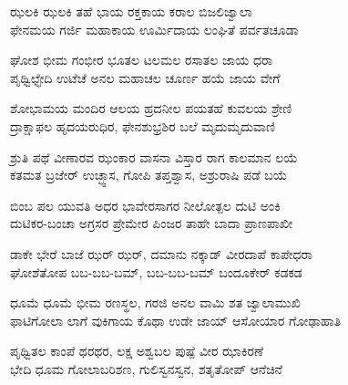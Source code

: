 
\begin{myquote}
ಝಲಕಿ ಝಲಕಿ ತಹೆ ಭಾಯ ರಕ್ತಕಾಯ ಕರಾಲ ಬಿಜಲಿಜ್ವಾಲಾ\\ಫೇನಮಯ ಗರ್ಜಿ ಮಹಾಕಾಯ ಊರ್ಮಿದಾಯ ಲಂಘಿತೆ ಪರ್ವತಚೂಡಾ
\end{myquote}


\begin{myquote}
ಘೋಶ ಭೀಮ ಗಂಭೀರ ಭೂತಲ ಟಲಮಲ ರಸಾತಲ ಜಾಯ ಧರಾ\\ಪೃಥ್ವಿಛ್ಛೇದಿ ಉಟೆಚೆ ಅನಲ ಮಹಾಚಲ ಚೂರ್ಣ ಹಯೆ ಜಾಯ ವೇಗೆ
\end{myquote}


\begin{myquote}
ಶೋಭಾಮಯ ಮಂದಿರ ಆಲಯ ಹ್ರದನೀಲ ಪಯತಹೆ ಕುವಲಯ ಶ್ರೇಣಿ\\ದ್ರಾಕ್ಷಾಫಲ ಹೃದಯರುಧಿರ, ಫೇನಶುಭ್ರಶಿರ ಬಲೆ ಮೃದುಮೃದುವಾಣಿ
\end{myquote}


\begin{myquote}
ಶ್ರುತಿ ಪಥೆ ವೀಣಾರವ ಝಂಕಾರ ವಾಸನಾ ವಿಸ್ತಾರ ರಾಗ ಕಾಲಮಾನ ಲಯೆ\\ಕತಮತ ಬ್ರಜೇರ್‌ ಉಚ್ಛ್ವಾಸ, ಗೋಪಿ ತಪ್ತಶ್ವಾಸ, ಅಶ್ರುರಾಷಿ ಪಡೆ ಬಯೆ
\end{myquote}


\begin{myquote}
ಬಿಂಬ ಪಲ ಯುವತಿ ಅಧರ ಭಾವೇರಸಾಗರ ನೀಲೋತ್ಪಲ ದುಟಿ ಅಂಕಿ\\ದುಟಿಕರ-ಬಂಚಾ ಅಗ್ರಸರ ಪ್ರೇಮೇರ ಪಿಂಜರ ತಾಹೇ ಬಾದಾ ಪ್ರಾಣಪಾಖೀ
\end{myquote}


\begin{myquote}
ಡಾಕೇ ಭೇರೆ ಬಾಜೆ ಝರ್ ಝರ್, ದಮಾನು ನಕ್ಕಾಡ್ ವೀರದಾಪೆ ಕಾಪೇಧರಾ\\ಘೋಶೆತೋಪ ಬಬ-ಬಬ-ಬಮ್, ಬಬ-ಬಬ-ಬಮ್ ಬಂದೂಕೇರ್ ಕಡಕಡ
\end{myquote}


\begin{myquote}
ಧೂಮೆ ಧೂಮೆ ಭೀಮ ರಣಸ್ಥಲ, ಗರಜಿ ಅನಲ ವಾಮಿ ಶತ ಜ್ವಾಲಾಮುಖಿ\\ಫಾಟಿಗೋಲಾ ಲಾಗೆ ವುಕಿಗಾಯ ಕೊಥಾ ಉಡೇ ಜಾಯ್ ಆಸೋಯಾರ ಗೋಢಾಹಾತಿ
\end{myquote}


\begin{myquote}
ಪೃಥ್ವಿತಲ ಕಾಂಪೆ ಥರಥರ, ಲಕ್ಷ ಅಶ್ವಬಲ ಪುಷ್ಪೆ ವೀರ ಝಾಕಿರಣೆ\\ಭೇದಿ ಧೂಮ ಗೋಲಾಬರಿಶಣ, ಗುಲಿಸ್ವನಸ್ವನ, ಶತೃತೋಪ್ ಆನೆಚಿನೆ
\end{myquote}

